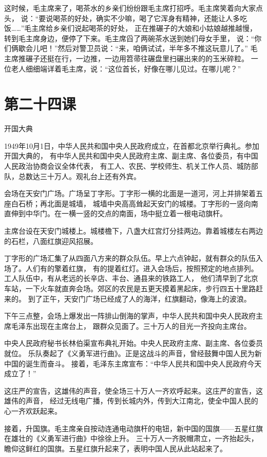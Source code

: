 \documentclass[12pt,UTF8]{ctexbook}
\begin{document}
这时候，毛主席来了，喝茶水的乡亲们纷纷跟毛主席打招呼。毛主席笑着向大家点头，
说：“要说喝茶的好处，确实不少嘛，喝了它浑身有精神，还能让人多吃饭……”毛主席给乡亲们说起喝茶的好处，
正在推碾子的大娘和小姑娘越推越慢，转到毛主席身边，便停了下来。毛主席舀了两碗茶水送到她们母女手里，
说：“你们俩歇会儿吧！”然后对警卫员说：“来，咱俩试试，半年多不推这玩意儿了。”
毛主席推碾子还挺在行，一边推，一边用笤帚往碾盘里扫碾出来的的玉米碎粒。
一位老人细细端详着毛主席，说：“这位首长，好像在哪儿见过。在哪儿呢？”

\section{第二十四课}

开国大典

1949年10月1日，中华人民共和国中央人民政府成立，在首都北京举行典礼。参加开国大典的，
有中华人民共和国中央人民政府主席、副主席、各位委员，有中国人民政治协商会议全体代表，
有工人、农民、学校师生、机关工作人员、城防部队，总数达三十万人。观礼台上还有外宾。

会场在天安门广场。广场呈丁字形。丁字形一横的北面是一道河，河上并排架着五座白石桥；再北面是城墙，
城墙中央高高耸起天安门的城楼。丁字形的一竖向南直伸到中华门。在一横一竖的交点的南面，场中挺立着一根电动旗杆。

主席台设在天安门城楼上。城楼檐下，八盏大红宫灯分挂两边。靠着城楼左右两边的石栏，八面红旗迎风招展。

丁字形的广场汇集了从四面八方来的群众队伍。早上六点钟起，就有群众的队伍入场了。人们有的擎着红旗，
有的提着红灯。进入会场后，按照预定的地点排列。工人队伍中，有从老远的长辛店、丰台、通县来的铁路工人，
他们清早到了北京车站，一下火车就直奔会场。郊区的农民是五更天摸着黑起床，步行四五十里路赶来的。
到了正午，天安门广场已经成了人的海洋，红旗翻动，像海上的波浪。

下午三点整，会场上爆发出一阵排山倒海的掌声，中华人民共和国中央人民政府主席毛泽东出现在主席台上，
跟群众见面了。三十万人的目光一齐投向主席台。

中央人民政府秘书长林伯渠宣布典礼开始。中央人民政府主席、副主席、各位委员就位。
乐队奏起了《义勇军进行曲》。正是这战斗的声音，曾经鼓舞中国人民为新中国的诞生而奋斗。
接着，毛泽东主席宣布：“中华人民共和国中央人民政府今天成立了！”

这庄严的宣告，这雄伟的声音，使全场三十万人一齐欢呼起来。这庄严的宣告，这雄伟的声音，
经过无线电广播，传到长城内外，传到大江南北，使全中国人民的心一齐欢跃起来。

接着，升国旗。毛主席亲自按动连通电动旗杆的电钮，新中国的国旗——五星红旗在雄壮的《义勇军进行曲》中徐徐上升。
三十万人一齐脱帽肃立，一齐抬起头，瞻仰这鲜红的国旗。五星红旗升起来了，表明中国人民从此站起来了。
\end{document}
